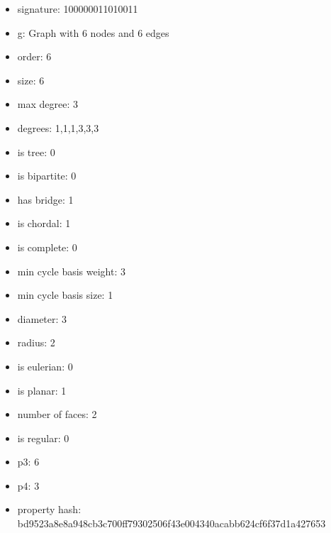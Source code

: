 \begin{itemize}
\item signature: 100000011010011
\item g: Graph with 6 nodes and 6 edges
\item order: 6
\item size: 6
\item max degree: 3
\item degrees: 1,1,1,3,3,3
\item is tree: 0
\item is bipartite: 0
\item has bridge: 1
\item is chordal: 1
\item is complete: 0
\item min cycle basis weight: 3
\item min cycle basis size: 1
\item diameter: 3
\item radius: 2
\item is eulerian: 0
\item is planar: 1
\item number of faces: 2
\item is regular: 0
\item p3: 6
\item p4: 3
\item property hash: bd9523a8e8a948cb3c700ff79302506f43e004340acabb624cf6f37d1a427653
\end{itemize}
\newpage
\begin{figure}
\end{figure}
